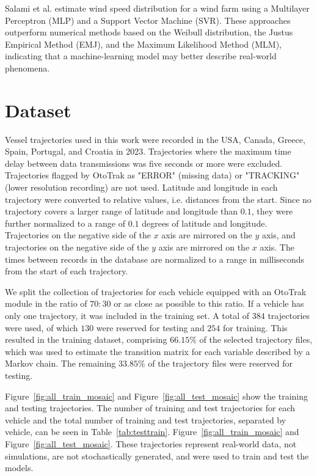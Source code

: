 \documentclass[preprint,12pt]{elsarticle}
\begin{document}
Salami et al. \citep{salami2022wind} estimate wind speed distribution for a wind farm using a Multilayer Perceptron (MLP) and a Support Vector Machine (SVR). These approaches outperform numerical methods based on the Weibull distribution, the Justus Empirical Method (EMJ), and the Maximum Likelihood Method (MLM), indicating that a machine-learning model may better describe real-world phenomena.

\section{Dataset}
\label{sec:Dataset}

Vessel trajectories used in this work were recorded in the USA, Canada, Greece, Spain, Portugal, and Croatia in 2023. Trajectories where the maximum time delay between data transmissions was five seconds or more were excluded. Trajectories flagged by OtoTrak as "ERROR" (missing data) or "TRACKING" (lower resolution recording) are not used. Latitude and longitude in each trajectory were converted to relative values, i.e. distances from the start. Since no trajectory covers a larger range of latitude and longitude than $0.1$, they were further normalized to a range of $0.1$ degrees of latitude and longitude. Trajectories on the negative side of the $x$ axis are mirrored on the $y$ axis, and trajectories on the negative side of the $y$ axis are mirrored on the $x$ axis. The times between records in the database are normalized to a range in milliseconds from the start of each trajectory.

We split the collection of trajectories for each vehicle equipped with an OtoTrak module in the ratio of $70:30$ or as close as possible to this ratio. If a vehicle has only one trajectory, it was included in the training set. A total of $384$ trajectories were used, of which $130$ were reserved for testing and $254$ for training. This resulted in the training dataset, comprising $66.15\%$ of the selected trajectory files, which was used to estimate the transition matrix for each variable described by a Markov chain. The remaining $33.85\%$ of the trajectory files were reserved for testing.

Figure~\ref{fig:all_train_mosaic} and Figure~\ref{fig:all_test_mosaic} show the training and testing trajectories. The number of training and test trajectories for each vehicle and the total number of training and test trajectories, separated by vehicle, can be seen in Table~\ref{tab:testtrain}. Figure~\ref{fig:all_train_mosaic} and Figure~\ref{fig:all_test_mosaic}. These trajectories represent real-world data, not simulations, are not stochastically generated, and were used to train and test the models.
\end{document}
